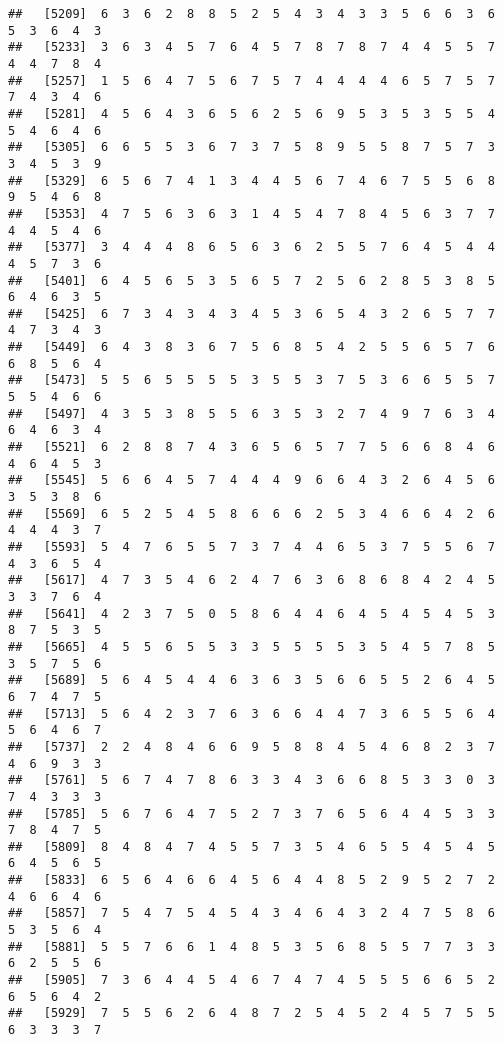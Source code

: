 \documentclass[
]{book}
\begin{document}
\begin{verbatim}
##   [5209]  6  3  6  2  8  8  5  2  5  4  3  4  3  3  5  6  6  3  6  5  3  6  4  3
##   [5233]  3  6  3  4  5  7  6  4  5  7  8  7  8  7  4  4  5  5  7  4  4  7  8  4
##   [5257]  1  5  6  4  7  5  6  7  5  7  4  4  4  4  6  5  7  5  7  7  4  3  4  6
##   [5281]  4  5  6  4  3  6  5  6  2  5  6  9  5  3  5  3  5  5  4  5  4  6  4  6
##   [5305]  6  6  5  5  3  6  7  3  7  5  8  9  5  5  8  7  5  7  3  3  4  5  3  9
##   [5329]  6  5  6  7  4  1  3  4  4  5  6  7  4  6  7  5  5  6  8  9  5  4  6  8
##   [5353]  4  7  5  6  3  6  3  1  4  5  4  7  8  4  5  6  3  7  7  4  4  5  4  6
##   [5377]  3  4  4  4  8  6  5  6  3  6  2  5  5  7  6  4  5  4  4  4  5  7  3  6
##   [5401]  6  4  5  6  5  3  5  6  5  7  2  5  6  2  8  5  3  8  5  6  4  6  3  5
##   [5425]  6  7  3  4  3  4  3  4  5  3  6  5  4  3  2  6  5  7  7  4  7  3  4  3
##   [5449]  6  4  3  8  3  6  7  5  6  8  5  4  2  5  5  6  5  7  6  6  8  5  6  4
##   [5473]  5  5  6  5  5  5  5  3  5  5  3  7  5  3  6  6  5  5  7  5  5  4  6  6
##   [5497]  4  3  5  3  8  5  5  6  3  5  3  2  7  4  9  7  6  3  4  6  4  6  3  4
##   [5521]  6  2  8  8  7  4  3  6  5  6  5  7  7  5  6  6  8  4  6  4  6  4  5  3
##   [5545]  5  6  6  4  5  7  4  4  4  9  6  6  4  3  2  6  4  5  6  3  5  3  8  6
##   [5569]  6  5  2  5  4  5  8  6  6  6  2  5  3  4  6  6  4  2  6  4  4  4  3  7
##   [5593]  5  4  7  6  5  5  7  3  7  4  4  6  5  3  7  5  5  6  7  4  3  6  5  4
##   [5617]  4  7  3  5  4  6  2  4  7  6  3  6  8  6  8  4  2  4  5  3  3  7  6  4
##   [5641]  4  2  3  7  5  0  5  8  6  4  4  6  4  5  4  5  4  5  3  8  7  5  3  5
##   [5665]  4  5  5  6  5  5  3  3  5  5  5  5  3  5  4  5  7  8  5  3  5  7  5  6
##   [5689]  5  6  4  5  4  4  6  3  6  3  5  6  6  5  5  2  6  4  5  6  7  4  7  5
##   [5713]  5  6  4  2  3  7  6  3  6  6  4  4  7  3  6  5  5  6  4  5  6  4  6  7
##   [5737]  2  2  4  8  4  6  6  9  5  8  8  4  5  4  6  8  2  3  7  4  6  9  3  3
##   [5761]  5  6  7  4  7  8  6  3  3  4  3  6  6  8  5  3  3  0  3  7  4  3  3  3
##   [5785]  5  6  7  6  4  7  5  2  7  3  7  6  5  6  4  4  5  3  3  7  8  4  7  5
##   [5809]  8  4  8  4  7  4  5  5  7  3  5  4  6  5  5  4  5  4  5  6  4  5  6  5
##   [5833]  6  5  6  4  6  6  4  5  6  4  4  8  5  2  9  5  2  7  2  4  6  6  4  6
##   [5857]  7  5  4  7  5  4  5  4  3  4  6  4  3  2  4  7  5  8  6  5  3  5  6  4
##   [5881]  5  5  7  6  6  1  4  8  5  3  5  6  8  5  5  7  7  3  3  6  2  5  5  6
##   [5905]  7  3  6  4  4  5  4  6  7  4  7  4  5  5  5  6  6  5  2  6  5  6  4  2
##   [5929]  7  5  5  6  2  6  4  8  7  2  5  4  5  2  4  5  7  5  5  6  3  3  3  7

\end{verbatim}
\end{document}
